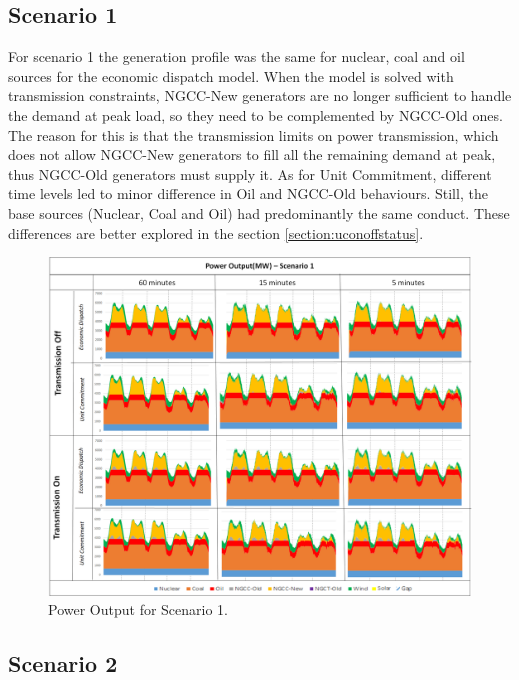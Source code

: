 \documentclass[12pt,LUDisStyle,twosided]{book}
\begin{document}
\subsection{Scenario 1}


For scenario 1 the generation profile was the same for nuclear, coal and oil sources for the economic dispatch model. When the model is solved with transmission constraints, NGCC-New generators are no longer sufficient to handle the demand at peak load, so they need to be complemented by NGCC-Old ones. The reason for this is that the transmission limits on power transmission, which does not allow NGCC-New generators to fill all the remaining demand at peak, thus NGCC-Old generators must supply it. As for Unit Commitment, different time levels led to minor difference in Oil and NGCC-Old behaviours. Still, the base sources (Nuclear, Coal and Oil) had predominantly the same conduct. These differences are better explored in the section \ref{section:uconoffstatus}.

\begin{figure}[H]
  \centering
	  \includegraphics[width=\textwidth,height=\textheight,keepaspectratio]{PowerOutputScenario1.png}
  \caption{Power Output for Scenario 1.}
  \label{fig:powerOutputScenario1}
\end{figure}


\subsection{Scenario 2}
\end{document}
